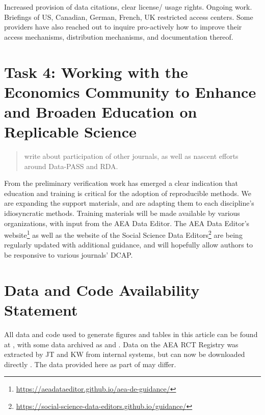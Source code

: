 \documentclass[PP]{AEA}
\newcommand{\urlcite}[2]{#2\footnote{\url{#1}}}
\begin{document}
Increased provision of data citations, clear license/ usage rights. Ongoing work. Briefings of US, Canadian, German, French, UK restricted access centers. Some providers have also reached out to inquire pro-actively how to improve their access mechanisms, distribution mechanisms, and documentation thereof.

\section{Task 4: Working with the Economics Community to Enhance and Broaden Education on Replicable Science}

\begin{quote}
    write about participation of other journals, as well as nascent efforts around Data-PASS and RDA.
\end{quote}

From the preliminary verification work has emerged a clear indication that education and training is critical for the adoption of reproducible methods. We are expanding the support materials, and are adapting them to each discipline's idiosyncratic methods. Training materials will be made available by various organizations, with input from the AEA Data Editor. The \urlcite{https://aeadataeditor.github.io/aea-de-guidance/}{AEA Data Editor's website} as well as the website of the \urlcite{https://social-science-data-editors.github.io/guidance/}{Social Science Data Editors} are being regularly updated with additional guidance, and will hopefully allow authors to be responsive to various journals' \ac{DCAP}.

\section{Data and Code Availability Statement}
\label{sec:dcas}

All data and code used to generate figures and tables in this article can be found at \citet{E117884V1}, with some data archived as \citet{E117873V1} and \citet{E117876V1}. Data on the AEA RCT Registry was extracted by JT and KW from internal systems, but can now be downloaded directly \citep{DVN/DFMLIU_2020}. The data provided here as part of \citet{E117884V1} may differ.

\FloatBarrier
%
%



\appendix

%
\end{document}
